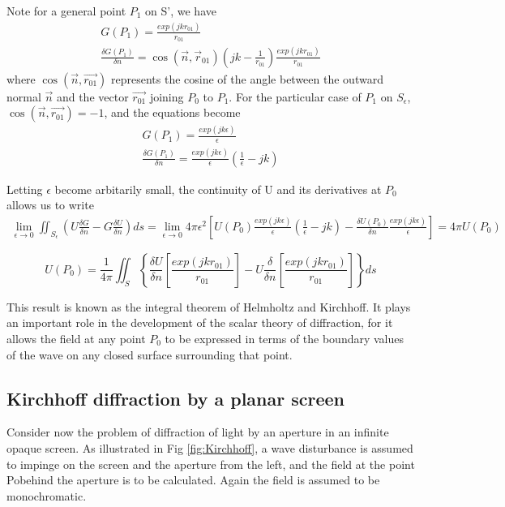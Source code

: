 \documentclass[../main.tex]{subfiles}
\begin{document}
	Note for a general point $P_1$ on S', we have
	\begin{align}
	G(P_1)=\frac{exp(jkr_{01})}{r_{01}}\\
	\frac{\delta G(P_1)}{\delta n}=\cos(\vec{n},\vec{r}_{01})(jk-\frac{1}{r_{01}})\frac{exp(jkr_{01})}{r_{01}}
	\end{align}
	where $\cos(\vec{n},\vec{r_{01}})$ represents the cosine of the angle between the outward normal $\vec{n}$ and the vector $\vec{r_{01}}$ joining $P_0$ to $P_1$. For the particular case of $P_1$ on $S_\epsilon$, $\cos(\vec{n},\vec{r_{01}})=-1$, and the equations become
	\begin{align}
	G(P_1)=\frac{exp(jk\epsilon)}{\epsilon}\\
	\frac{\delta G(P_1)}{\delta n}=\frac{exp(jk\epsilon)}{\epsilon}(\frac{1}{\epsilon}-jk)
	\end{align}

	Letting $\epsilon$ become arbitarily small, the continuity of U and its derivatives at $P_0$ allows us to write
	\begin{align}
	\lim_{\epsilon\to 0}{\iint_{S_\epsilon}\left(U\frac{\delta G}{\delta n}-G\frac{\delta U}{\delta n}\right)}ds
	=\lim_{\epsilon\to 0}4\pi\epsilon^2\left[U(P_0)\frac{exp(jk\epsilon)}{\epsilon}\left(\frac{1}{\epsilon}-jk\right)-\frac{\delta U(P_0)}{\delta n}\frac{exp(jk\epsilon)}{\epsilon}\right]
	=4\pi U(P_0)
	\end{align}

	\begin{equation}
	U(P_0)=\frac{1}{4\pi}\iint_S\left\{\frac{\delta U}{\delta n}\left[\frac{exp(jkr_{01})}{r_{01}}\right]-U\frac{\delta}{\delta n}\left[\frac{exp(jkr_{01})}{r_{01}}\right]\right\}ds
	\end{equation}

	This result is known as the integral theorem of Helmholtz and Kirchhoff. It plays an important role in the development of the scalar theory of diffraction, for it allows the field at any point $P_0$ to be expressed in terms of the boundary values of the wave on any closed surface surrounding that point.

	\subsection{Kirchhoff diffraction by a planar screen}
	Consider now the problem of diffraction of light by an aperture in an infinite opaque screen. As illustrated in Fig \ref{fig:Kirchhoff}, a wave disturbance is assumed to impinge on the screen and the aperture from the left, and the field at the point Pobehind the aperture is to be calculated. Again the field is assumed to be monochromatic.
\end{document}
